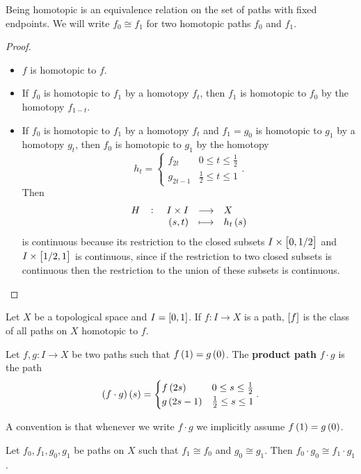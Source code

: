 \begin{lemma}
Being homotopic is an equivalence relation on the set of paths with fixed endpoints. We will write $ f_0 \cong f_1 $ for two homotopic paths $ f_0 $ and $ f_1 $.
\end{lemma}

\begin{proof}
\hfill
\begin{itemize}
\item $ f $ is homotopic to $ f $.
\item If $ f_0 $ is homotopic to $ f_1 $ by a homotopy $ f_t $, then $ f_1 $ is homotopic to $ f_0 $ by the homotopy $ f_{1 - t} $.
\item If $ f_0 $ is homotopic to $ f_1 $ by a homotopy $ f_t $ and $ f_1 = g_0 $ is homotopic to $ g_1 $ by a homotopy $ g_t $, then $ f_0 $ is homotopic to $ g_1 $ by the homotopy
$$ h_t =
\begin{cases}
f_{2t} & 0 \le t \le \tfrac{1}{2} \\
g_{2t - 1} & \tfrac{1}{2} \le t \le 1
\end{cases}.
$$
Then
$$ \function[H]{I \times I}{X}{\br{s, t}}{h_t\br{s}} $$
is continuous because its restriction to the closed subsets $ I \times \sbr{0, 1 / 2} $ and $ I \times \sbr{1 / 2, 1} $ is continuous, since if the restriction to two closed subsets is continuous then the restriction to the union of these subsets is continuous.
\end{itemize}
\end{proof}

\pagebreak


Let $ X $ be a topological space and $ I = \sbr{0, 1} $. If $ f : I \to X $ is a path, $ \sbr{f} $ is the class of all paths on $ X $ homotopic to $ f $.

\begin{definition*}
Let $ f, g : I \to X $ be two paths such that $ f\br{1} = g\br{0} $. The \textbf{product path} $ f \cdot g $ is the path
$$ \br{f \cdot g}\br{s} =
\begin{cases}
f\br{2s} & 0 \le s \le \tfrac{1}{2} \\
g\br{2s - 1} & \tfrac{1}{2} \le s \le 1
\end{cases}.
$$
\end{definition*}

A convention is that whenever we write $ f \cdot g $ we implicitly assume $ f\br{1} = g\br{0} $.

\begin{lemma}
\label{lem:1.2}
Let $ f_0, f_1, g_0, g_1 $ be paths on $ X $ such that $ f_1 \cong f_0 $ and $ g_0 \cong g_1 $. Then $ f_0 \cdot g_0 \cong f_1 \cdot g_1 $.
\end{lemma}

